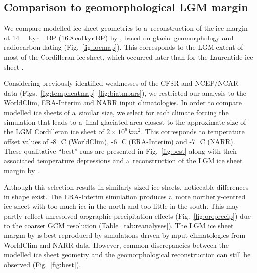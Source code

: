 \documentclass[tc, ms]{copernicus}
\begin{document}
\subsection{Comparison to geomorphological LGM margin}

We compare modelled ice sheet geometries to a~reconstruction of the ice margin at 14\,\unit{\,kyr\,BP} (16.8\,cal\,kyr\,BP) by \citet{dyke-2004}, based on glacial geomorphology and radiocarbon dating (Fig.~\ref{fig:locmap}). This corresponds to the LGM extent of most of the Cordilleran ice sheet, which occurred later than for the Laurentide ice sheet \citep{porter-swanson-1998,dyke-2004,stroeven-etal-2010,stroeven-etal-inpress}.

Considering previously identified weaknesses of the CFSR and NCEP/NCAR data (Figs.~\ref{fig:tempheatmap}--\ref{fig:biatmbars}), we restricted our analysis to the WorldClim, ERA-Interim and NARR input climatologies. In order to compare modelled ice sheets of a~similar size, we select for each climate forcing the simulation that leads to a~final glaciated area closest to the approximate size of the LGM Cordilleran ice sheet of $2\times 10^6\,\unit{km^2}$. This corresponds to temperature offset values of -8\,\unit{{\degree}C} (WorldClim), -6\,\unit{{\degree}C} (ERA-Interim) and -7\,\unit{{\degree}C} (NARR). These qualitative ``best'' runs are presented in Fig.~\ref{fig:best} along with their associated temperature depressions and a~reconstruction of the LGM ice sheet margin by \citet{dyke-2004}.

Although this selection results in similarly sized ice sheets, noticeable differences in shape exist. The ERA-Interim simulation produces a~more northerly-centred ice sheet with too much ice in the north and too little in the south. This may partly reflect unresolved orographic precipitation effects (Fig.~\ref{fig:oroprecip}) due to the coarser GCM resolution (Table~\ref{tab:reanalyses}). The LGM ice sheet margin by \citet{dyke-2004} is best reproduced by simulations driven by input climatologies from WorldClim and NARR data. However, common discrepancies between the modelled ice sheet geometry and the geomorphological reconstruction can still be observed (Fig.~\ref{fig:best}).
\end{document}
